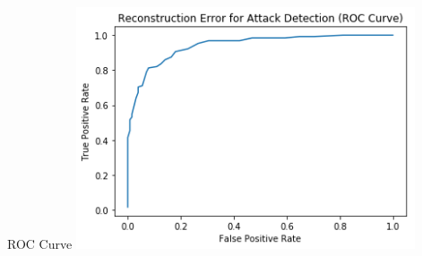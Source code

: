 \documentclass{beamer}
\begin{document}
	\begin{frame}{ROC Curve}
		\centering
		\includegraphics[width=10cm]{mse_roc}
	\end{frame}
	
	

	
\end{document}
